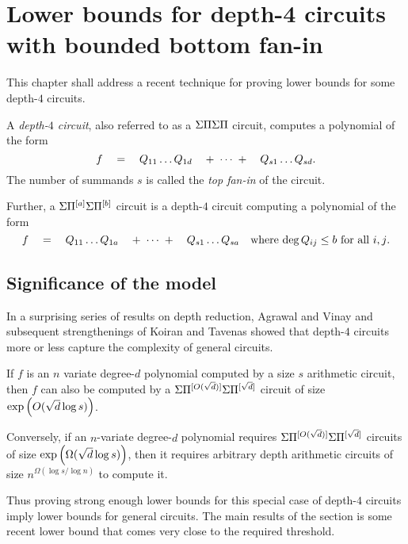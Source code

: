 \chapter{Lower bounds for depth-4 circuits with bounded bottom fan-in}

This chapter shall address a recent technique for proving lower bounds for some depth-$4$ circuits. 

\begin{definition}
  A \emph{depth-$4$ circuit}, also referred to as a $\Sigma\Pi\Sigma\Pi$ circuit, computes a polynomial of the form 
  $$
  f \quad = \quad Q_{11}\dots Q_{1d} \quad +\;\cdots\;+ \quad  Q_{s1}\dots Q_{sd}.
  $$
  The number of summands $s$ is called the \emph{top fan-in} of the circuit. 

  Further, a $\Sigma\Pi^{[a]}\Sigma\Pi^{[b]}$ circuit is a depth-$4$ circuit computing a polynomial of the form
  $$
  f \quad = \quad Q_{11}\dots Q_{1a} \quad +\;\cdots\;+ \quad  Q_{s1}\dots Q_{sa}\quad\text{where $\deg Q_{ij} \leq b$ for all $i,j$}.
  $$
\end{definition}

\section{Significance of the model}

In a surprising series of results on depth reduction, Agrawal and Vinay \cite{av08} and subsequent strengthenings of Koiran \cite{koiran} and Tavenas \cite{Tav13} showed that depth-$4$ circuits more or less capture the complexity of general circuits. 

\begin{theorem} 
  If $f$ is an $n$ variate degree-$d$ polynomial computed by a size $s$ arithmetic circuit, then $f$ can also be computed by a $\Sigma\Pi^{[O(\sqrt{d})]}\Sigma\Pi^{[\sqrt{d}]}$ circuit of size $\exp\left(O(\sqrt{d}\log s)\right)$. 
  
  Conversely, if an $n$-variate degree-$d$ polynomial requires $\Sigma\Pi^{[O(\sqrt{d})]}\Sigma\Pi^{[\sqrt{d}]}$  circuits of size $\exp\left(\Omega(\sqrt{d}\log s)\right)$, then it requires arbitrary depth arithmetic circuits of size $n^{\Omega(\log s / \log n)}$ to compute it. 
\end{theorem}

Thus proving strong enough lower bounds for this special case of depth-$4$ circuits imply lower bounds for general circuits. The main results of the section is some recent lower bound \cite{gkks13,KSS13,FLMS13} that comes very close to the required threshold. 


